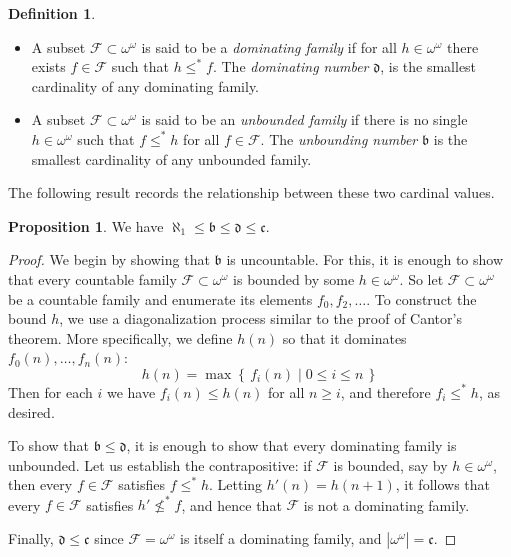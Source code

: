 \documentclass[11pt,oneside]{amsart}
\newcommand{\set}[1]{\left\{\,#1\,\right\}}
\theoremstyle{definition}
\newtheorem{prop}[thm]{Proposition}
\theoremstyle{definition}
\newtheorem{defn}[thm]{Definition}
\theoremstyle{remark}
\begin{document}
\begin{defn}
  \begin{itemize}
  \item A subset $\mathcal F\subset\omega^\omega$ is said to be a \emph{dominating family} if for all $h\in\omega^\omega$ there exists $f\in\mathcal F$ such that $h\leq^*f$. The \emph{dominating number} $\mathfrak d$, is the smallest cardinality of any dominating family.
  \item A subset $\mathcal F\subset\omega^\omega$ is said to be an \emph{unbounded family} if there is no single $h\in\omega^\omega$ such that $f\leq^*h$ for all $f\in\mathcal F$. The \emph{unbounding number} $\mathfrak b$ is the smallest cardinality of any unbounded family.
  \end{itemize}
\end{defn}

The following result records the relationship between these two cardinal values.

\begin{prop}
  We have $\aleph_1\leq\mathfrak{b}\leq\mathfrak{d}\leq\mathfrak{c}$.
\end{prop}
	
\begin{proof}
  We begin by showing that $\mathfrak{b}$ is uncountable. For this, it is enough to show that every countable family $\mathcal F\subset\omega^\omega$ is bounded by some $h\in\omega^\omega$. So let $\mathcal F\subset\omega^\omega$ be a countable family and enumerate its elements $f_0,f_2,\ldots$. To construct the bound $h$, we use a diagonalization process similar to the proof of Cantor's theorem. More specifically, we define $h(n)$ so that it dominates $f_0(n),\ldots,f_n(n)$:
\[h(n)=\max\set{f_i(n)\mid 0\leq i\leq n}
\]
Then for each $i$ we have $f_i(n)\leq h(n)$ for all $n\geq i$, and therefore $f_i\leq^*h$, as desired.

To show that $\mathfrak{b}\leq\mathfrak{d}$, it is enough to show that every dominating family is unbounded. Let us establish the contrapositive: if $\mathcal F$ is bounded, say by $h\in\omega^\omega$, then every $f\in\mathcal F$ satisfies $f\leq^*h$. Letting $h'(n)=h(n+1)$, it follows that every $f\in\mathcal F$ satisfies $h'\not\leq^*f$, and hence that $\mathcal F$ is not a dominating family.

Finally, $\mathfrak d\leq\mathfrak c$ since $\mathcal F=\omega^\omega$ is itself a dominating family, and $|\omega^\omega|=\mathfrak c$.
\end{proof}
\end{document}
